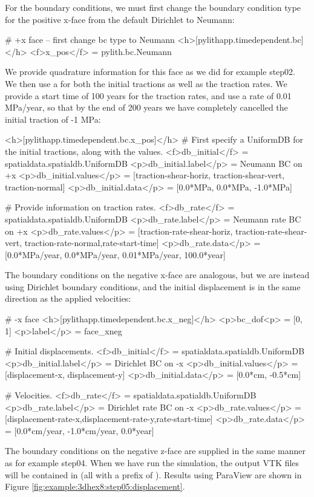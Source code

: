 For the boundary conditions, we must first change the boundary condition
type for the positive x-face from the default Dirichlet to Neumann:
\begin{cfg}
# +x face -- first change bc type to Neumann
<h>[pylithapp.timedependent.bc]</h>
<f>x_pos</f> = pylith.bc.Neumann 
\end{cfg}
We provide quadrature information for this face as we did for example
step02. We then use a  for both the initial tractions
as well as the traction rates. We provide a start time of 100 years
for the traction rates, and use a rate of 0.01 MPa/year, so that by
the end of 200 years we have completely cancelled the initial traction
of -1 MPa:
\begin{cfg}
<h>[pylithapp.timedependent.bc.x_pos]</h>
# First specify a UniformDB for the initial tractions, along with the values.
<f>db_initial</f> = spatialdata.spatialdb.UniformDB
<p>db_initial.label</p> = Neumann BC on +x
<p>db_initial.values</p> = [traction-shear-horiz, traction-shear-vert, traction-normal]
<p>db_initial.data</p> = [0.0*MPa, 0.0*MPa, -1.0*MPa]

# Provide information on traction rates.
<f>db_rate</f> = spatialdata.spatialdb.UniformDB
<p>db_rate.label</p> = Neumann rate BC on +x
<p>db_rate.values</p> = [traction-rate-shear-horiz, traction-rate-shear-vert, traction-rate-normal,rate-start-time]
<p>db_rate.data</p> = [0.0*MPa/year, 0.0*MPa/year, 0.01*MPa/year, 100.0*year]
\end{cfg}
The boundary conditions on the negative x-face are analogous, but
we are instead using Dirichlet boundary conditions, and the initial
displacement is in the same direction as the applied velocities:
\begin{cfg}
# -x face
<h>[pylithapp.timedependent.bc.x_neg]</h>
<p>bc_dof<p> = [0, 1]
<p>label</p> = face_xneg

# Initial displacements.
<f>db_initial</f> = spatialdata.spatialdb.UniformDB
<p>db_initial.label</p> = Dirichlet BC on -x
<p>db_initial.values</p> = [displacement-x, displacement-y]
<p>db_initial.data</p> = [0.0*cm, -0.5*cm]

# Velocities.
<f>db_rate</f> = spatialdata.spatialdb.UniformDB
<p>db_rate.label</p> = Dirichlet rate BC on -x
<p>db_rate.values</p> = [displacement-rate-x,displacement-rate-y,rate-start-time]
<p>db_rate.data</p> = [0.0*cm/year, -1.0*cm/year, 0.0*year]
\end{cfg}
The boundary conditions on the negative z-face are supplied in the
same manner as for example step04. When we have run the simulation,
the output VTK files will be contained in 
(all with a prefix of ). Results using ParaView are
shown in Figure \vref{fig:example:3dhex8:step05:displacement}.

